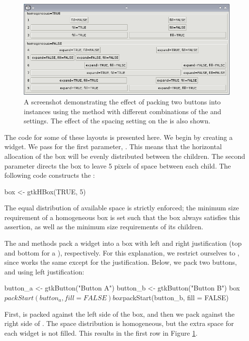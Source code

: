 \documentclass[article,shortnames]{jss}
\begin{document}
\begin{figure}[h!tbp]
\begin{center}
\includegraphics{packing.png}
\caption{\label{fig:packing}A screenshot demonstrating the effect of
packing two
buttons into  instances using the 
method 
with different combinations of the  and 
settings. 
The effect of the  spacing setting on the
 is 
also shown.}
\end{center}
\end{figure}

The code for some of these layouts is presented here. We begin by
creating a  widget. We pass  for the
first parameter, . This means that the horizontal
allocation of the box will be evenly distributed between the children. 
The second parameter directs the box to leave 5 pixels of space
between each child.  The following code constructs the :
\begin{Code}
box <- gtkHBox(TRUE, 5)
\end{Code}
The equal distribution of available space is strictly enforced; the
minimum size requirement of a homogeneous box is set such that the box
always satisfies this assertion, as well as the minimum size
requirements of its children.

The  and  methods pack a
widget into a box with left and right justification (top and
bottom for a ), respectively. For this explanation, we
restrict ourselves to , since
 works the same except for the
justification. Below, we pack two buttons,  and
 using left justification:
\begin{Code}
button_a <- gtkButton("Button A")
button_b <- gtkButton("Button B")
box$packStart(button_a, fill = FALSE)
box$packStart(button_b, fill = FALSE)
\end{Code}
First,  is packed against the left side of the box,
and then we pack  against the right side of
.
The space distribution is homogeneous, but
the extra space for each widget is not filled. This results in the
first row in Figure \ref{fig:packing}.
\end{document}
